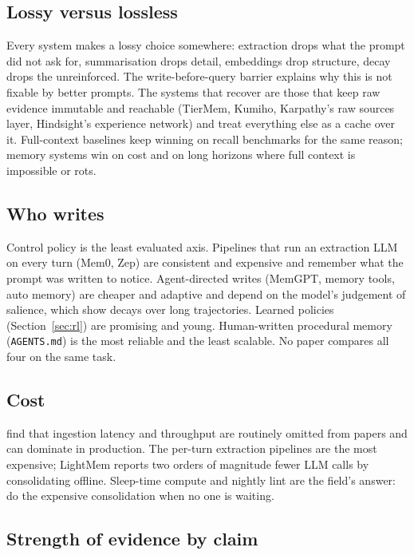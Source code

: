 \documentclass[11pt]{article}
\begin{document}
\subsection{Lossy versus lossless}

Every system makes a lossy choice somewhere: extraction drops what the prompt did not ask for, summarisation drops detail, embeddings drop structure, decay drops the unreinforced. The write-before-query barrier \citep{zhu2026tiermem} explains why this is not fixable by better prompts. The systems that recover are those that keep raw evidence immutable and reachable (TierMem, Kumiho, Karpathy's raw sources layer, Hindsight's experience network) and treat everything else as a cache over it. Full-context baselines keep winning on recall benchmarks for the same reason; memory systems win on cost and on long horizons where full context is impossible or rots.

\subsection{Who writes}

Control policy is the least evaluated axis. Pipelines that run an extraction LLM on every turn (Mem0, Zep) are consistent and expensive and remember what the prompt was written to notice. Agent-directed writes (MemGPT, memory tools, auto memory) are cheaper and adaptive and depend on the model's judgement of salience, which \citet{wu2026proactive} show decays over long trajectories. Learned policies (Section~\ref{sec:rl}) are promising and young. Human-written procedural memory (\texttt{AGENTS.md}) is the most reliable and the least scalable. No paper compares all four on the same task.

\subsection{Cost}

\citet{jiang2026anatomy} find that ingestion latency and throughput are routinely omitted from papers and can dominate in production. The per-turn extraction pipelines are the most expensive; LightMem reports two orders of magnitude fewer LLM calls by consolidating offline. Sleep-time compute and nightly lint are the field's answer: do the expensive consolidation when no one is waiting.

\subsection{Strength of evidence by claim}
\end{document}
